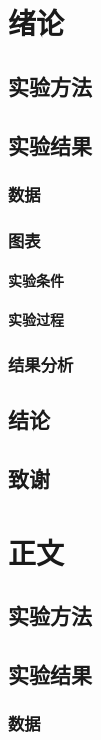 \documentclass{book}
\begin{document}
    \tableofcontents

    
    \chapter{绪论}
    \section{实验方法}
    \section{实验结果}
    \subsection{数据}
    \subsection{图表}
    \subsubsection{实验条件}
    \subsubsection{实验过程}
    \subsection{结果分析}
    \section{结论}
    \section{致谢}


    \chapter{正文}
    \section{实验方法}
    \section{实验结果}
    \subsection{数据}
\end{document}
